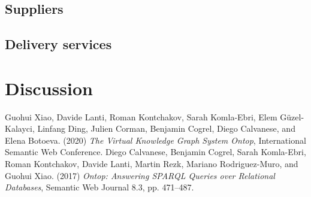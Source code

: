 \documentclass{article}
\begin{document}
\subsection{Suppliers}




\subsection{Delivery services}





\section{Discussion}



\begin{thebibliography}{99}
Guohui Xiao, Davide Lanti, Roman Kontchakov, Sarah Komla-Ebri, Elem Güzel-Kalayci, Linfang Ding, Julien Corman, Benjamin Cogrel, Diego Calvanese, and Elena Botoeva. (2020) \emph{The Virtual Knowledge Graph System Ontop}, International Semantic Web Conference.
Diego Calvanese, Benjamin Cogrel, Sarah Komla-Ebri, Roman Kontchakov, Davide Lanti, Martin Rezk, Mariano Rodriguez-Muro, and Guohui Xiao. (2017) \emph{Ontop: Answering SPARQL Queries over Relational Databases}, Semantic Web Journal 8.3, pp. 471–487.
\end{thebibliography}
\end{document}

